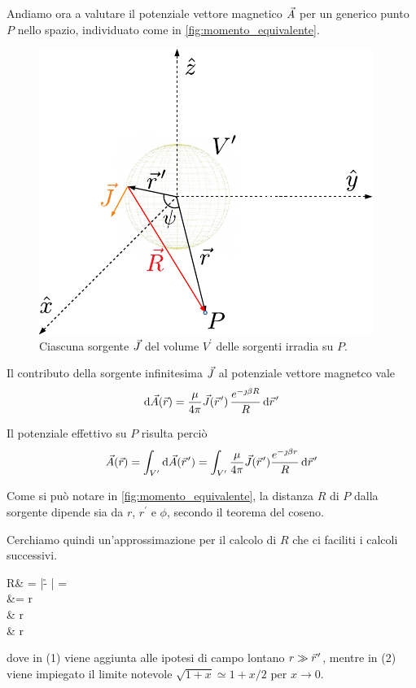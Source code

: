 Andiamo ora a valutare il potenziale vettore magnetico $\vec{A}$ per un generico punto $P$ nello spazio, individuato come in \autoref{fig:momento_equivalente}.

\begin{figure}[htp]
	\centering
	\includegraphics[]{img/momento_equivalente.pdf}
	\caption{Ciascuna sorgente $\vec{J}$ del volume $V^\prime$ delle sorgenti irradia su $P$.}
	\label{fig:momento_equivalente}
\end{figure}

Il contributo della sorgente infinitesima $\vec{J}$ al potenziale vettore magnetco vale
\begin{equation}
	\de \A(\r)
	= \frac{\mu}{4\pi} \J(\rp) \, \frac{e^{-\jmath \beta R}}{R} \de \rp
\end{equation}

Il potenziale effettivo su $P$ risulta perciò
\begin{equation} \label{eq:A_di_P}
	\A(\r)=\int_{V^\prime} \de \A(\rp) =\int_{V^\prime} \frac{\mu}{4\pi} \J(\rp) \frac{\ejbr}{R} \de \rp
\end{equation}

Come si può notare in \autoref{fig:momento_equivalente}, la distanza $R$ di $P$ dalla sorgente dipende sia da $r$, $r^\prime$ e $\phi$, secondo il teorema del coseno.

Cerchiamo quindi un'approssimazione per il calcolo di $R$ che ci faciliti i calcoli successivi.

\begin{esp} \label{eq:approssimazione_per_R}
	R&
	= |\r - \rp|
	=  \\
	&= r \,  \\
	& r \,  \\
	& r 
\end{esp}
dove in (1) viene aggiunta alle ipotesi di campo lontano $r \gg \rp$, mentre in (2) viene impiegato il limite notevole $\sqrt{1 + x} \simeq 1 + x/2$ per $x \to 0$.

